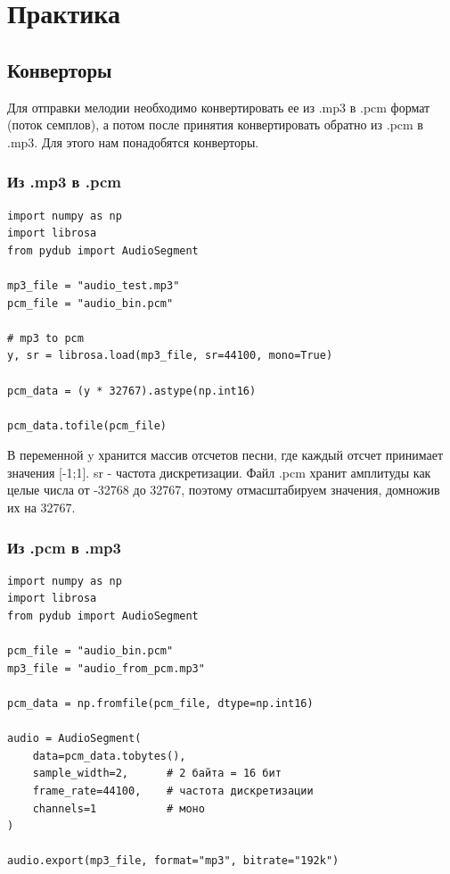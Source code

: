 \chapter{Практика}
\label{ch:chap2}

\section{Конверторы}

Для отправки мелодии необходимо конвертировать ее из .mp3 в .pcm формат (поток семплов), а потом после принятия конвертировать 
обратно из .pcm в .mp3. Для этого нам понадобятся конверторы. 

\subsection{Из .mp3 в .pcm}

\begin{lstlisting}
import numpy as np
import librosa
from pydub import AudioSegment

mp3_file = "audio_test.mp3"
pcm_file = "audio_bin.pcm"

# mp3 to pcm
y, sr = librosa.load(mp3_file, sr=44100, mono=True)

pcm_data = (y * 32767).astype(np.int16)

pcm_data.tofile(pcm_file)
\end{lstlisting}

В переменной y хранится массив отсчетов песни, где каждый отсчет принимает значения [-1;1]. sr - частота дискретизации. 
Файл .pcm хранит амплитуды как целые числа от -32768 до 32767, поэтому отмасштабируем значения, домножив их на 32767.

\subsection{Из .pcm в .mp3}

\begin{lstlisting}
import numpy as np
import librosa
from pydub import AudioSegment

pcm_file = "audio_bin.pcm"
mp3_file = "audio_from_pcm.mp3"

pcm_data = np.fromfile(pcm_file, dtype=np.int16)

audio = AudioSegment(
    data=pcm_data.tobytes(),
    sample_width=2,      # 2 байта = 16 бит
    frame_rate=44100,    # частота дискретизации
    channels=1           # моно
)

audio.export(mp3_file, format="mp3", bitrate="192k")
\end{lstlisting}

